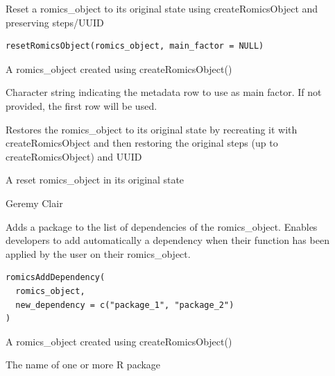 \documentclass[a4paper]{book}
\begin{document}
%
\begin{Description}
Reset a romics\_object to its original state using createRomicsObject and preserving steps/UUID
\end{Description}
%
\begin{Usage}
\begin{verbatim}
resetRomicsObject(romics_object, main_factor = NULL)
\end{verbatim}
\end{Usage}
%
\begin{Arguments}
\begin{ldescription}
\item[\code{romics\_object}] A romics\_object created using createRomicsObject()

\item[\code{main\_factor}] Character string indicating the metadata row to use as main factor. If not provided, the first row will be used.
\end{ldescription}
\end{Arguments}
%
\begin{Details}
Restores the romics\_object to its original state by recreating it with createRomicsObject
and then restoring the original steps (up to createRomicsObject) and UUID
\end{Details}
%
\begin{Value}
A reset romics\_object in its original state
\end{Value}
%
\begin{Author}
Geremy Clair
\end{Author}
%
\begin{Description}
Adds a package to the list of dependencies of the romics\_object. Enables developers to add automatically a dependency when their function has been applied by the user on their romics\_object.
\end{Description}
%
\begin{Usage}
\begin{verbatim}
romicsAddDependency(
  romics_object,
  new_dependency = c("package_1", "package_2")
)
\end{verbatim}
\end{Usage}
%
\begin{Arguments}
\begin{ldescription}
\item[\code{romics\_object}] A romics\_object created using createRomicsObject()

\item[\code{new\_dependency}] The name of one or more R package
\end{ldescription}
\end{Arguments}
\end{document}
